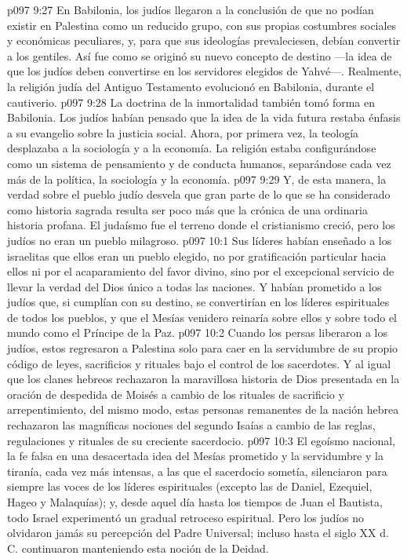 \vs p097 9:27 \pc En Babilonia, los judíos llegaron a la conclusión de que no podían existir en Palestina como un reducido grupo, con sus propias costumbres sociales y económicas peculiares, y, para que sus ideologías prevaleciesen, debían convertir a los gentiles. Así fue como se originó su nuevo concepto de destino ---la idea de que los judíos deben convertirse en los servidores elegidos de Yahvé---. Realmente, la religión judía del Antiguo Testamento evolucionó en Babilonia, durante el cautiverio.
\vs p097 9:28 La doctrina de la inmortalidad también tomó forma en Babilonia. Los judíos habían pensado que la idea de la vida futura restaba énfasis a su evangelio sobre la justicia social. Ahora, por primera vez, la teología desplazaba a la sociología y a la economía. La religión estaba configurándose como un sistema de pensamiento y de conducta humanos, separándose cada vez más de la política, la sociología y la economía.
\vs p097 9:29 \pc Y, de esta manera, la verdad sobre el pueblo judío desvela que gran parte de lo que se ha considerado como historia sagrada resulta ser poco más que la crónica de una ordinaria historia profana. El judaísmo fue el terreno donde el cristianismo creció, pero los judíos no eran un pueblo milagroso.
\vs p097 10:1 Sus líderes habían enseñado a los israelitas que ellos eran un pueblo elegido, no por gratificación particular hacia ellos ni por el acaparamiento del favor divino, sino por el excepcional servicio de llevar la verdad del Dios único a todas las naciones. Y habían prometido a los judíos que, si cumplían con su destino, se convertirían en los líderes espirituales de todos los pueblos, y que el Mesías venidero reinaría sobre ellos y sobre todo el mundo como el Príncipe de la Paz.
\vs p097 10:2 Cuando los persas liberaron a los judíos, estos regresaron a Palestina solo para caer en la servidumbre de su propio código de leyes, sacrificios y rituales bajo el control de los sacerdotes. Y al igual que los clanes hebreos rechazaron la maravillosa historia de Dios presentada en la oración de despedida de Moisés a cambio de los rituales de sacrificio y arrepentimiento, del mismo modo, estas personas remanentes de la nación hebrea rechazaron las magníficas nociones del segundo Isaías a cambio de las reglas, regulaciones y rituales de su creciente sacerdocio.
\vs p097 10:3 El egoísmo nacional, la fe falsa en una desacertada idea del Mesías prometido y la servidumbre y la tiranía, cada vez más intensas, a las que el sacerdocio sometía, silenciaron para siempre las voces de los líderes espirituales (excepto las de Daniel, Ezequiel, Hageo y Malaquías); y, desde aquel día hasta los tiempos de Juan el Bautista, todo Israel experimentó un gradual retroceso espiritual. Pero los judíos no olvidaron jamás su percepción del Padre Universal; incluso hasta el siglo XX d. C. continuaron manteniendo esta noción de la Deidad.
